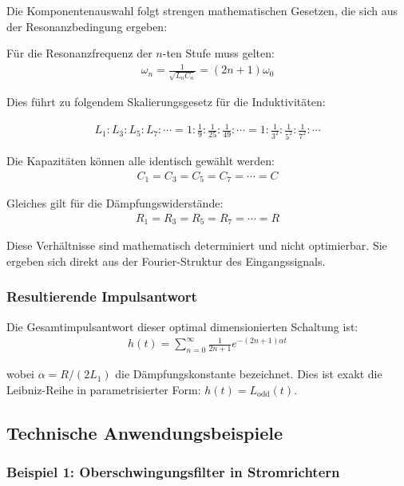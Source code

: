 \documentclass[a4paper,12pt,twoside]{report}
\theoremstyle{definition}
\begin{document}
Die Komponentenauswahl folgt strengen mathematischen Gesetzen, die sich aus der Resonanzbedingung ergeben:

Für die Resonanzfrequenz der $n$-ten Stufe muss gelten:
\begin{align}
	\omega_n = \frac{1}{\sqrt{L_n C_n}} = (2n+1) \omega_0
\end{align}

Dies führt zu folgendem Skalierungsgesetz für die Induktivitäten:

\begin{align}
	L_1 : L_3 : L_5 : L_7 : \cdots = 1 : \frac{1}{9} : \frac{1}{25} : \frac{1}{49} : \cdots = 1 : \frac{1}{3^2} : \frac{1}{5^2} : \frac{1}{7^2} : \cdots
\end{align}

Die Kapazitäten können alle identisch gewählt werden:
\begin{align}
	C_1 = C_3 = C_5 = C_7 = \cdots = C
\end{align}

Gleiches gilt für die Dämpfungswiderstände:
\begin{align}
	R_1 = R_3 = R_5 = R_7 = \cdots = R
\end{align}

Diese Verhältnisse sind mathematisch determiniert und nicht optimierbar. Sie ergeben sich direkt aus der Fourier-Struktur des Eingangssignals.

\subsubsection*{Resultierende Impulsantwort}

Die Gesamtimpulsantwort dieser optimal dimensionierten Schaltung ist:
\begin{align}
	h(t) = \sum_{n=0}^{\infty} \frac{1}{2n+1} e^{-(2n+1)\alpha t}
\end{align}

wobei $\alpha = R/(2L_1)$ die Dämpfungskonstante bezeichnet. Dies ist exakt die Leibniz-Reihe in parametrisierter Form: $h(t) = L_{\text{odd}}(t)$.

\subsection{Technische Anwendungsbeispiele}

\subsubsection*{Beispiel 1: Oberschwingungsfilter in Stromrichtern}
\end{document}
